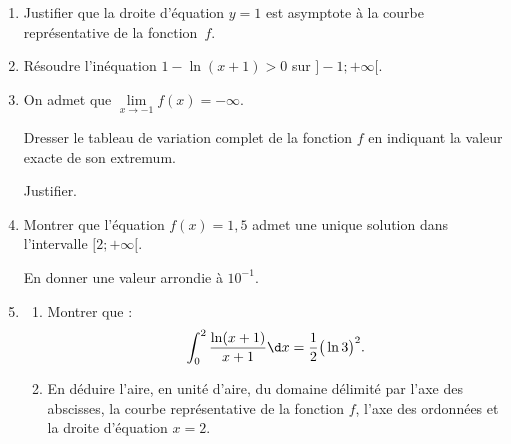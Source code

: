 	\begin{enumerate}
		\item Justifier que la droite d'équation \quad $y=1$ \quad est asymptote à la courbe représentative de la fonction~$f$.

		\item Résoudre l'inéquation \quad $1-\ln (x+1)>0$ \quad sur $]-1 ;+\infty[$.

		\item On admet que \quad $\lim\limits_{x \to -1} f(x)=-\infty$.

		Dresser le tableau de variation complet de la fonction $f$ en indiquant la valeur exacte de son extremum.

		Justifier.

		\item Montrer que l'équation \quad $f(x)=1,5$ \quad admet une unique solution dans l'intervalle $[2 ; +\infty[$.

		En donner une valeur arrondie à $10^{-1}$.

		\item \begin{enumerate}
			\item Montrer que :
			\[\int_{0}^{2} \dfrac{\ln (x+1)}{x+1} \d x=\dfrac{1}{2}\big(\ln 3\big)^{2}.\]

			\item En déduire l'aire, en unité d'aire, du domaine délimité par l'axe des abscisses, la courbe représentative de la fonction $f$, l'axe des ordonnées et la droite d'équation \quad $x=2$.
		\end{enumerate}
	\end{enumerate}

